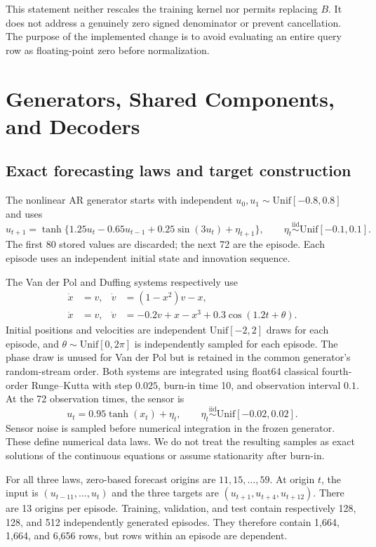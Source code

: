 This statement neither rescales the training kernel nor permits replacing
$B$. It does not address a genuinely zero signed denominator or prevent
cancellation. The purpose of the implemented change is to avoid evaluating
an entire query row as floating-point zero before normalization.

\section{Generators, Shared Components, and Decoders}\label{app:methods}

\subsection{Exact forecasting laws and target construction}

The nonlinear AR generator starts with independent
$u_0,u_1\sim\mathrm{Unif}[-0.8,0.8]$ and uses
\[
 u_{t+1}=\tanh\{1.25u_t-0.65u_{t-1}
                   +0.25\sin(3u_t)+\eta_{t+1}\},
 \qquad\eta_t\stackrel{\mathrm{iid}}\sim\mathrm{Unif}[-0.1,0.1].
\]
The first 80 stored values are discarded; the next 72 are the episode.
Each episode uses an independent initial state and innovation sequence.

The Van der Pol and Duffing systems respectively use
\begin{align*}
 \dot x&=v,& \dot v&=(1-x^2)v-x,\\
 \dot x&=v,& \dot v&=-0.2v+x-x^3+0.3\cos(1.2t+\theta).
\end{align*}
Initial positions and velocities are independent
$\mathrm{Unif}[-2,2]$ draws for each episode, and
$\theta\sim\mathrm{Unif}[0,2\pi]$ is independently sampled for each
episode. The phase draw is unused for Van der Pol but is retained in
the common generator's random-stream order. Both systems are integrated
using float64 classical fourth-order Runge--Kutta with step $0.025$,
burn-in time 10, and observation interval $0.1$. At the 72 observation
times, the sensor is
\[
 u_t=0.95\tanh(x_t)+\eta_t,
 \qquad \eta_t\stackrel{\mathrm{iid}}\sim\mathrm{Unif}[-0.02,0.02].
\]
Sensor noise is sampled before numerical integration in the frozen
generator. These define numerical data laws. We do not treat the
resulting samples as exact solutions of the continuous equations or
assume stationarity after burn-in.

For all three laws, zero-based forecast origins are
$11,15,\ldots,59$. At origin $t$, the input is
$(u_{t-11},\ldots,u_t)$ and the three targets are
$(u_{t+1},u_{t+4},u_{t+12})$. There are 13 origins per episode.
Training, validation, and test contain respectively 128, 128, and 512
independently generated episodes. They therefore contain 1,664, 1,664,
and 6,656 rows, but rows within an episode are dependent.


